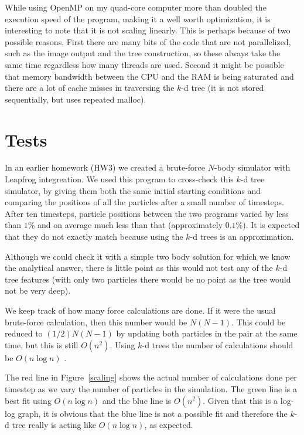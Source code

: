 \documentclass[11pt]{article}
\begin{document}
While using OpenMP on my quad-core computer more than doubled the execution speed of the program, making it a well worth optimization, it is interesting to note that it is not scaling linearly.
This is perhaps because of two possible reasons.
First there are many bits of the code that are not parallelized, such as the image output and the tree construction, so these always take the same time regardless how many threads are used.
Second it might be possible that memory bandwidth between the CPU and the RAM is being saturated and there are a lot of cache misses in traversing the $k$-d tree (it is not stored sequentially, but uses repeated malloc).

\section{Tests}
In an earlier homework (HW3) we created a brute-force $N$-body simulator with Leapfrog integreation.
We used this program to cross-check this $k$-d tree simulator, by giving them both the same initial starting conditions and comparing the positions of all the particles after a small number of timesteps.
After ten timesteps, particle positions between the two programs varied by less than $1\%$ and on average much less than that (approximately $0.1\%$).
It is expected that they do not exactly match because using the $k$-d trees is an approximation.

Although we could check it with a simple two body solution for which we know the analytical answer, there is little point as this would not test any of the $k$-d tree features (with only two particles there would be no point as the tree would not be very deep).

We keep track of how many force calculations are done.
If it were the usual brute-force calculation, then this number would be $N(N-1)$.
This could be reduced to $(1/2) N(N-1)$ by updating both particles in the pair at the same time, but this is still $O(n^2)$.
Using $k$-d trees the number of calculations should be $O(n \log n)$ \cite{kdgrav}.

The red line in Figure~\ref{scaling} shows the actual number of calculations done per timestep as we vary the number of particles in the simulation.
The green line is a best fit using $O(n \log n)$ and the blue line is $O(n^2)$.
Given that this is a log-log graph, it is obvious that the blue line is not a possible fit and therefore the $k$-d tree really is acting like $O(n \log n)$, as expected.
\end{document}
